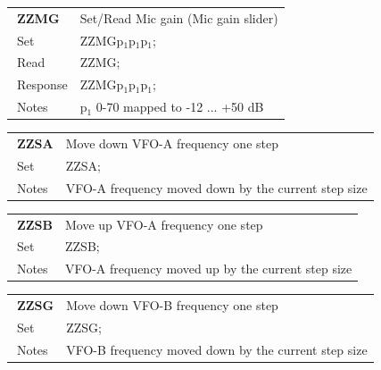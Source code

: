 \documentclass[12pt]{book}
\begin{document}
\begin{center}
\begin{tabular}{|p{2cm}|p{11cm}|}
\toprule
$\phantom{\Big|}$\textbf{\large ZZMG} & Set/Read Mic gain (Mic gain slider) \\\cline{1-2}
$\phantom{\Big|}${\large Set} & {ZZMGp$_1$p$_1$p$_1$;} \\\hline
$\phantom{\Big|}${\large Read} & {ZZMG;} \\\hline
$\phantom{\Big|}${\large Response} & {ZZMGp$_1$p$_1$p$_1$;} \\\hline
$\phantom{\Big|}${\large Notes} & \multicolumn{1}{|p{11cm}|}{p$_1$ 0-70 mapped to -12 ... +50 dB} \\
\bottomrule
\end{tabular}
\end{center}

\begin{center}
\begin{tabular}{|p{2cm}|p{11cm}|}
\toprule
$\phantom{\Big|}$\textbf{\large ZZSA} & Move down VFO-A frequency one step \\\cline{1-2}
$\phantom{\Big|}${\large Set} & {ZZSA;} \\\hline
$\phantom{\Big|}${\large Notes} & \multicolumn{1}{|p{11cm}|}{VFO-A frequency moved down by the current step size} \\
\bottomrule
\end{tabular}
\end{center}

\begin{center}
\begin{tabular}{|p{2cm}|p{11cm}|}
\toprule
$\phantom{\Big|}$\textbf{\large ZZSB} & Move up VFO-A frequency one step \\\cline{1-2}
$\phantom{\Big|}${\large Set} & {ZZSB;} \\\hline
$\phantom{\Big|}${\large Notes} & \multicolumn{1}{|p{11cm}|}{VFO-A frequency moved up by the current step size} \\
\bottomrule
\end{tabular}
\end{center}

\begin{center}
\begin{tabular}{|p{2cm}|p{11cm}|}
\toprule
$\phantom{\Big|}$\textbf{\large ZZSG} & Move down VFO-B frequency one step \\\cline{1-2}
$\phantom{\Big|}${\large Set} & {ZZSG;} \\\hline
$\phantom{\Big|}${\large Notes} & \multicolumn{1}{|p{11cm}|}{VFO-B frequency moved down by the current step size} \\
\bottomrule
\end{tabular}
\end{center}
\end{document}

